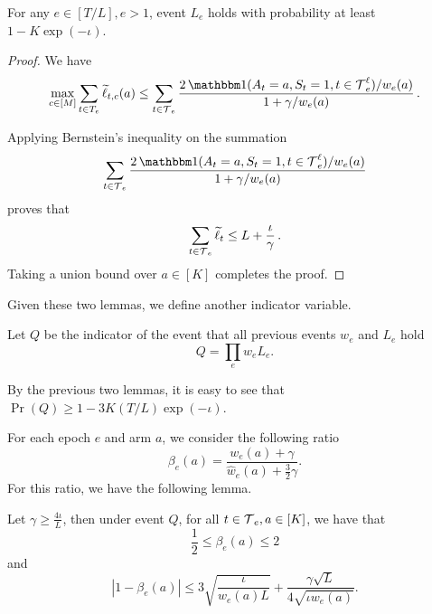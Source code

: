 \begin{lemma}
\label{lem: indicator_L}

    For any $e \in[T / L], e>1$, event $L_e$ holds with probability at least $1-K \exp (-\iota)$.
\end{lemma}
\begin{proof}
We have
\begin{align*}
    \max_{c\in[M]}\sum_{t\in T_e}\widetilde{\ell}_{t,c}(a)\le \sum_{t\in \Time_e} \frac{2\indi(A_t = a,S_t=1,t \in \Time_{e}^{\ell})/w_{e}(a)}{1+\gamma/w_{e}(a)}\,.
\end{align*}

Applying Bernstein's inequality on the summation \[\sum_{t\in \Time_e} \frac{2\indi(A_t = a,S_t=1,t \in \Time_{e}^{\ell})/w_{e}(a)}{1+\gamma/w_{e}(a)}\] proves that
\begin{align*}
    \sum_{t\in\operatorname{\mathcal{T}}_e}\widetilde{\ell}_t \le L +\frac{\iota}{\gamma}\,.
\end{align*}
Taking a union bound over $a \in [K]$ completes the proof.
\end{proof}

Given these two lemmas, we define another indicator variable.

\begin{definition}
Let $Q$ be the indicator of the event that all previous events $w_e$ and $L_e$ hold
\[Q = \prod_e w_e L_e.\]
\end{definition}

By the previous two lemmas, it is easy to see that $\Pr(Q) \ge 1 - 3 K(T / L) \exp (-\iota)$.

For each epoch $e$ and arm $a$, we consider the following ratio
\[\beta_e(a) = \frac{w_e(a) + \gamma}{\widehat{w}_e(a) + \frac{3}{2} \gamma}.\]
For this ratio, we have the following lemma.

\begin{lemma}
\label{lem: beta_concentration}
Let $\gamma \geq \frac{4 \iota}{L}$, then under event $Q$, for all $t \in \operatorname{\mathcal{T}}_e, a \in[K]$, we have that
$$
\frac{1}{2} \le \beta_{e}(a) \le 2
$$
and
$$
\left|1-\beta_e(a)\right| \le 3 \sqrt{\frac{\iota}{w_{e}(a) L}}+\frac{\gamma \sqrt{L}}{4 \sqrt{\iota w_{e}(a)}}. 
$$
\end{lemma}


